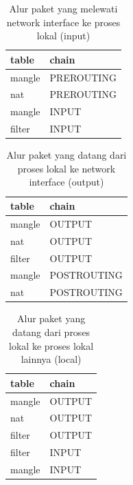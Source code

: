 \begin{table}[H]
	\caption{Alur paket yang melewati network interface ke proses lokal (input)}
	\label{table:network_to_local}
	\centering
	\begin{tabular}{ll}
		\hline
		\rowcolor[HTML]{C0C0C0} 
		table  & chain      \\ \hline
		mangle & PREROUTING \\
		nat    & PREROUTING \\
		mangle & INPUT      \\
		filter & INPUT      \\ \hline
	\end{tabular}	
\end{table}

\begin{table}[H]
	\caption{Alur paket yang datang dari proses lokal ke network interface (output)}
	\label{table:local_to_network}
	\centering
	\begin{tabular}{ll}
		\hline
		\rowcolor[HTML]{C0C0C0} 
		table  & chain       \\ \hline
		mangle & OUTPUT      \\
		nat    & OUTPUT      \\
		filter & OUTPUT      \\
		mangle & POSTROUTING \\
		nat    & POSTROUTING \\ \hline
	\end{tabular}
\end{table}

\begin{table}[H]
	\caption{Alur paket yang datang dari proses lokal ke proses lokal lainnya (local)}
	\label{table:local_to_local}
	\centering
	\begin{tabular}{ll}
		\hline
		\rowcolor[HTML]{C0C0C0} 
		table  & chain  \\ \hline
		mangle & OUTPUT \\
		nat    & OUTPUT \\
		filter & OUTPUT \\
		filter & INPUT  \\
		mangle & INPUT  \\ \hline
	\end{tabular}
\end{table}